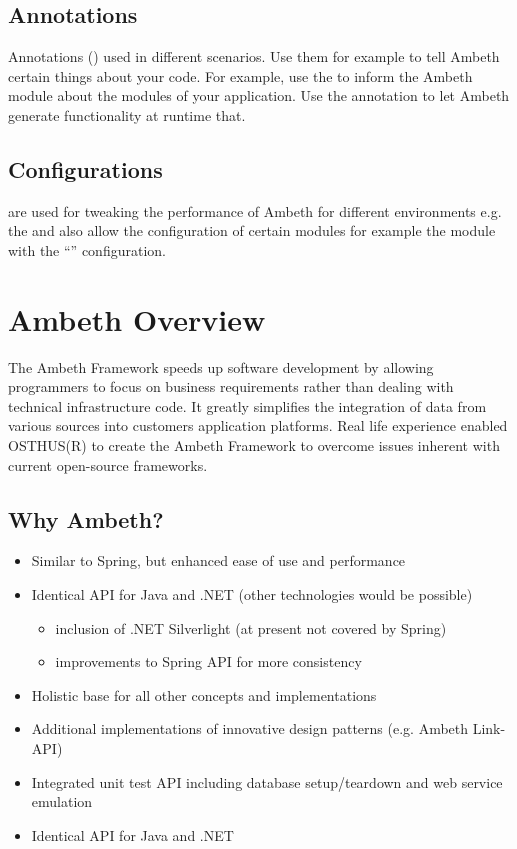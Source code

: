 \subsection{Annotations}
Annotations () used in different scenarios. Use them for example to tell Ambeth certain things about your code. For example, use the   to inform the Ambeth  module about the modules of your application. Use the  annotation to let Ambeth generate functionality at runtime that.

\subsection{Configurations}
 are used for tweaking the performance of Ambeth for different environments e.g. the  and also allow the configuration of certain modules for example the  module with the ``'' configuration.

\section{Ambeth Overview}
The Ambeth Framework speeds up software development by allowing programmers to focus on business requirements rather than dealing with technical infrastructure code. It greatly simplifies the integration of data from various sources into customers application platforms. Real life experience enabled OSTHUS(R) to create the Ambeth Framework to overcome issues inherent with current open-source frameworks.


\subsection{Why Ambeth?}

\begin{itemize}
	\item Similar to Spring, but enhanced ease of use and performance
	\item Identical API for Java and .NET (other technologies would be possible)
	\begin{itemize}
		\item inclusion of .NET Silverlight (at present not covered by Spring)
		\item improvements to Spring API for more consistency
	\end{itemize}
	\item Holistic base for all other concepts and implementations
	\item Additional implementations of innovative design patterns (e.g. Ambeth Link-API)
	\item Integrated unit test API including database setup/teardown and web service emulation
	\item Identical API for Java and .NET
\end{itemize}

